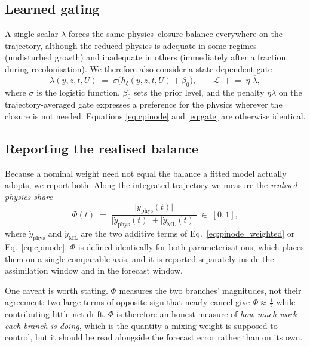 \subsection{Learned gating}
\label{sec:gate}

A single scalar $\lambda$ forces the same physics--closure balance everywhere on
the trajectory, although the reduced physics is adequate in some regimes
(undisturbed growth) and inadequate in others (immediately after a fraction,
during recolonisation). We therefore also consider a state-dependent gate
\begin{equation}
\label{eq:gate}
\lambda(y,z,t,U) \;=\; \sigma\!\bigl(h_{\xi}(y,z,t,U) + \beta_{0}\bigr),
\qquad
\mathcal{L} \;\mathrel{+}=\; \eta\;\overline{\lambda},
\end{equation}
where $\sigma$ is the logistic function, $\beta_{0}$ sets the prior level, and
the penalty $\eta\overline{\lambda}$ on the trajectory-averaged gate expresses a
preference for the physics wherever the closure is not needed. Equations
\eqref{eq:cpinode} and \eqref{eq:gate} are otherwise identical.

\subsection{Reporting the realised balance}
\label{sec:phi}

Because a nominal weight need not equal the balance a fitted model actually
adopts, we report both. Along the integrated trajectory we measure the
\emph{realised physics share}
\begin{equation}
\label{eq:phi}
\Phi(t) \;=\;
\frac{\bigl|\dot y_{\mathrm{phys}}(t)\bigr|}
     {\bigl|\dot y_{\mathrm{phys}}(t)\bigr| + \bigl|\dot y_{\mathrm{ML}}(t)\bigr|}
\;\in\;[0,1],
\end{equation}
where $\dot y_{\mathrm{phys}}$ and $\dot y_{\mathrm{ML}}$ are the two additive
terms of Eq.~\eqref{eq:pinode_weighted} or Eq.~\eqref{eq:cpinode}. $\Phi$ is
defined identically for both parameterisations, which places them on a single
comparable axis, and it is reported separately inside the assimilation window
and in the forecast window.

One caveat is worth stating. $\Phi$ measures the two branches' magnitudes, not
their agreement: two large terms of opposite sign that nearly cancel give
$\Phi\approx\tfrac12$ while contributing little net drift. $\Phi$ is therefore an
honest measure of \emph{how much work each branch is doing}, which is the
quantity a mixing weight is supposed to control, but it should be read alongside
the forecast error rather than on its own.
